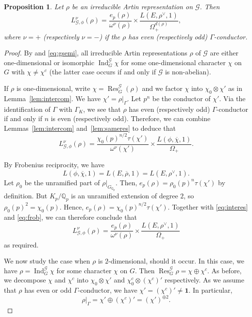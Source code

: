 \documentclass{amsart}
\newtheorem{proposition}[theorem]{Proposition}
\begin{document}
\begin{proposition}\label{prop:paLf}
Let $\rho$ be an irreducible Artin representation on ${\mathcal{G}}$. Then
\[
L_{{\mathcal{G}},\phi}^\nu(\rho)=\frac{e_p(\rho)}{\omega^\nu(\rho)}\times\frac{L(E,\rho^\vee,1)}{\Omega_+^{d(\rho)}},
\]
where $\nu=+$ (respectively $\nu=-$) if the $\rho$ has even (respectively odd) $\Gamma$-conductor.
\end{proposition}
\begin{proof}
By \cite[\S8.2]{serre78} and \eqref{eq:gsemi}, all irreducible Artin representations $\rho$ of ${\mathcal{G}}$ are either one-dimensional or isomorphic $\operatorname{Ind}_G^{\mathcal{G}}\chi$ for some one-dimensional character $\chi$ on $G$ with $\chi\ne\chi^c$ (the latter case occurs if and only if ${\mathcal{G}}$ is non-abelian).

If $\rho$ is one-dimensional, write $\chi=\operatorname{Res}_G^{\mathcal{G}}(\rho)$ and we factor $\chi$ into $\chi_0\otimes\chi'$ as in Lemma~\ref{lem:intercom}. We have $\chi'=\rho|_{\Gamma}$. Let $p^n$ be the conductor of $\chi'$. Via the identification of $\Gamma$ with $\Gamma_K$, we see that $\rho$ has even (respectively odd) $\Gamma$-conductor if and only if $n$ is even (respectively odd). Therefore, we can combine Lemmas~\ref{lem:intercom} and~\ref{lem:sameres} to deduce that
\begin{equation}\label{eq:interes}
L_{{\mathcal{G}},\phi}^\nu(\rho)=\frac{\chi_0(p)^{n/2}\tau(\chi')}{\omega^\nu(\chi')}\times \frac{L(\phi,\overline{\chi},1)}{\Omega_+}.
\end{equation}

By Frobenius reciprocity, we have
\begin{equation}\label{eq:frob}
L(\phi,\overline{\chi},1)=L(E,\overline{\rho},1)=L(E,\rho^\vee,1).
\end{equation}
Let $\rho_0$ be the unramified part of $\rho|_{G_{{\mathbb Q}_p}}$. Then, $e_p(\rho)=\rho_0(p)^n\tau(\chi')$ by definition. But $K_p/{{\mathbb Q}_p}$ is an unramified extension of degree $2$, so $\rho_0(p)^2=\chi_0(p)$. Hence, $e_p(\rho)=\chi_0(p)^{n/2}\tau(\chi')$. Together with \eqref{eq:interes} and \eqref{eq:frob}, we can therefore conclude that
\[
L_{{\mathcal{G}},\phi}^\nu(\rho)=\frac{e_p(\rho)}{\omega^\nu(\rho)}\times\frac{L(E,\rho^\vee,1)}{\Omega_+}
\] 
as required.

We now study the case when $\rho$ is $2$-dimensional, should it occur. In this case, we have $\rho=\operatorname{Ind}_G^{\mathcal{G}}\chi$ for some character $\chi$ on $G$. Then $\operatorname{Res}^{\mathcal{G}}_G\rho=\chi\oplus\chi^c$. As before, we decompose $\chi$ and $\chi^c$ into $\chi_0\otimes\chi'$ and $\chi_0^c\otimes(\chi^c)'$ respectively. As we assume that $\rho$ has even or odd $\Gamma$-conductor, we have $\chi'=(\chi^c)'\ne\mathbf{1}$. In particular,
\begin{equation}\label{eq:decom}
\rho|_{\Gamma}=\chi'\oplus(\chi^c)'=(\chi')^{\oplus2}.
\end{equation}


\end{proof}
\end{document}
